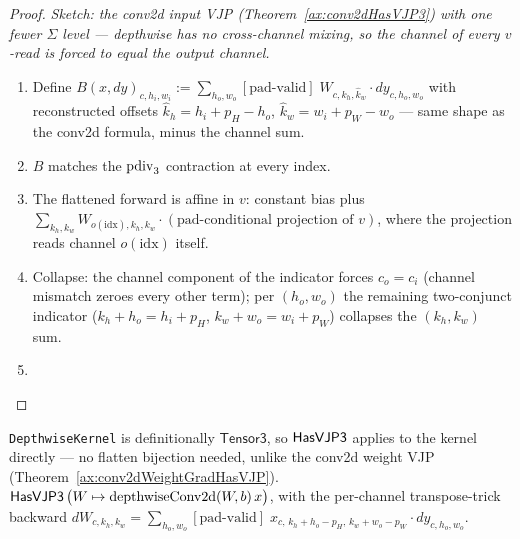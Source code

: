 \begin{proof}
\leanok
\emph{Sketch: the conv2d input VJP
(Theorem~\ref{ax:conv2dHasVJP3}) with one fewer \(\Sigma\) level ---
depthwise has no cross-channel mixing, so the channel of every
\(v\)-read is forced to equal the output channel.}
\begin{enumerate}
  \item Define \(B(x, dy)_{c, h_i, w_i} :=
    \sum_{h_o, w_o} [\text{pad-valid}]\;
      W_{c, \hat{k}_h, \hat{k}_w} \cdot dy_{c, h_o, w_o}\)
    with reconstructed offsets
    \(\hat{k}_h = h_i + p_H - h_o\), \(\hat{k}_w = w_i + p_W - w_o\)
    --- same shape as the conv2d formula, minus the channel sum.
  \item \Suffices{} \(B\) matches the \(\operatorname{pdiv}_3\) contraction at every
    index. 
  \item The flattened forward is affine in \(v\): constant bias plus
    \(\sum_{k_h, k_w} W_{o(\mathrm{idx}), k_h, k_w} \cdot
      (\text{pad-conditional projection of } v)\), where the
    projection reads channel \(o(\mathrm{idx})\) itself.
  \item Collapse: the channel component of the indicator forces
    \(c_o = c_i\) (channel mismatch zeroes every other term); per
    \((h_o, w_o)\) the remaining two-conjunct indicator
    (\(k_h + h_o = h_i + p_H\), \(k_w + w_o = w_i + p_W\)) collapses
    the \((k_h, k_w)\) sum.
  \item \Qed{}
\end{enumerate}
\end{proof}

\begin{theorem}
  \label{ax:depthwiseWeightGradHasVJP3}
  \leanok
  \texttt{DepthwiseKernel} is definitionally
  \(\mathsf{Tensor3}\), so \(\mathsf{HasVJP3}\) applies to the kernel
  directly --- no flatten bijection needed, unlike the conv2d weight
  VJP (Theorem~\ref{ax:conv2dWeightGradHasVJP}).
  \Prove{} \(\mathsf{HasVJP3}\,
    \bigl(W \mapsto \mathrm{depthwiseConv2d}(W, b)\, x\bigr)\),
  with the per-channel transpose-trick backward
  \(dW_{c, k_h, k_w} = \sum_{h_o, w_o} [\text{pad-valid}]\;
    x_{c,\, k_h + h_o - p_H,\, k_w + w_o - p_W} \cdot dy_{c, h_o, w_o}\).
\end{theorem}

